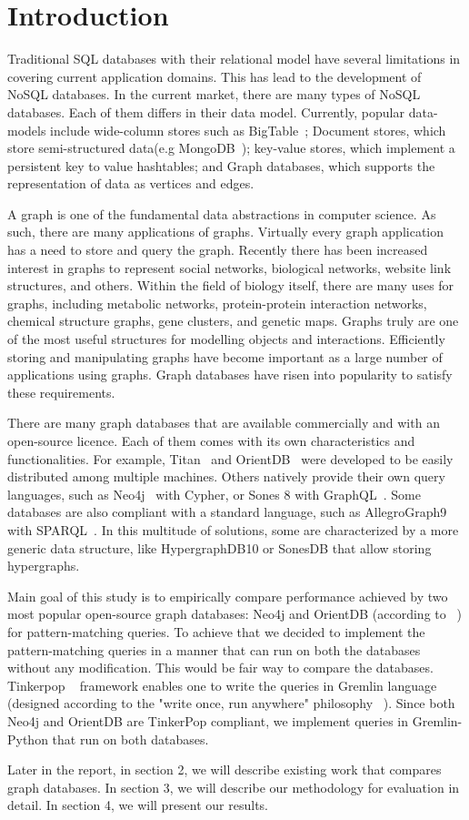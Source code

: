 \section{Introduction}

Traditional SQL databases with their relational model have several limitations in covering current application domains. This has lead to the development of NoSQL databases. In the current market, there are many types of NoSQL databases. Each of them differs in their data model. Currently, popular data-models include wide-column stores such as BigTable~\cite{chang2008bigtable}; Document stores, which store semi-structured data(e.g MongoDB~\cite{chodorow2013mongodb}); key-value stores, which implement a persistent key to value hashtables; and Graph databases, which supports the representation of data as vertices and edges.

A graph is one of the fundamental data abstractions in computer science. As such, there are many applications of graphs. Virtually every graph application has a need to store and query the graph. Recently there has been increased interest in graphs to represent social networks, biological networks, website link structures, and others. Within the field of biology itself, there are many uses for graphs, including metabolic networks, protein-protein interaction networks, chemical structure graphs, gene clusters, and genetic maps. Graphs truly are one of the most useful structures for modelling objects and interactions. Efficiently storing and manipulating graphs have become important as a large number of applications using graphs. Graph databases have risen into popularity to satisfy these requirements.

There are many graph databases that are available commercially and with an open-source licence. Each of them comes with its own characteristics and functionalities. For example, Titan~\cite{jouili2013empirical} and OrientDB~\cite{tesoriero2013getting} were developed to be easily distributed among multiple machines. Others natively provide their own query languages, such as Neo4j~\cite{holzschuher2013performance} with Cypher, or Sones 8 with GraphQL~\cite{vazquez2017improving}. Some databases are also compliant with a standard language, such as AllegroGraph9~\cite{abburu2013format} with SPARQL~\cite{abburu2013format}. In this multitude of solutions, some are characterized by a more generic data structure, like HypergraphDB10 or SonesDB that allow storing hypergraphs. 

Main goal of this study is to empirically compare performance achieved by two most popular open-source graph databases: Neo4j and OrientDB (according to ~\cite{dbranking}) for pattern-matching queries. To achieve that we decided to implement the pattern-matching queries in a manner that can  run on both the databases without any modification. This would be fair way to compare the databases. Tinkerpop ~\cite{tinkerpop} framework enables one to write the queries in Gremlin language (designed according to the "write once, run anywhere" philosophy ~\cite{gremlin}). Since both Neo4j and OrientDB are TinkerPop compliant, we implement queries in Gremlin-Python that run on both databases. 


Later in the report, in section 2, we will describe existing work that compares graph databases. In section 3, we will describe our methodology for evaluation in detail. In section 4, we will present our results.   




